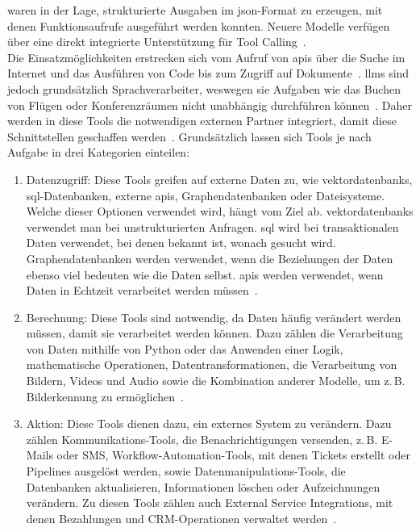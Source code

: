 waren in der Lage, strukturierte Ausgaben im \ac{json}-Format zu erzeugen, mit denen Funktionsaufrufe ausgeführt werden konnten. Neuere Modelle verfügen über eine direkt 
integrierte Unterstützung für Tool Calling~\cite[2]{tc14}. \\
Die Einsatzmöglichkeiten erstrecken sich vom Aufruf von \acp{api} über die Suche im Internet und das Ausführen von Code bis zum Zugriff auf Dokumente~\cite{tc03}. 
\acp{llm} sind jedoch grundsätzlich Sprachverarbeiter, weswegen sie Aufgaben wie das Buchen von Flügen oder Konferenzräumen nicht unabhängig durchführen können~\cite[6]{tc10}.
Daher werden in diese Tools die notwendigen externen Partner integriert, damit diese Schnittstellen geschaffen werden~\cite[6]{tc10}. Grundsätzlich lassen sich 
Tools je nach Aufgabe in drei Kategorien einteilen: 

\begin{enumerate}
    \item Datenzugriff: Diese Tools greifen auf externe Daten zu, wie \glspl{vektordatenbank}, \ac{sql}-Datenbanken, externe \acp{api}, Graphendatenbanken oder Dateisysteme. 
    Welche dieser Optionen verwendet wird, hängt vom Ziel ab. \glspl{vektordatenbank} verwendet man bei unstrukturierten Anfragen. \ac{sql} wird bei transaktionalen Daten 
    verwendet, bei denen bekannt ist, wonach gesucht wird. Graphendatenbanken werden verwendet, wenn die Beziehungen der Daten ebenso viel bedeuten wie die Daten 
    selbst. \acp{api} werden verwendet, wenn Daten in Echtzeit verarbeitet werden müssen~\cite{tc05}.
    \item Berechnung: Diese Tools sind notwendig, da Daten häufig verändert werden müssen, damit sie verarbeitet werden können. Dazu zählen die Verarbeitung
    von Daten mithilfe von Python oder das Anwenden einer Logik, mathematische Operationen, Datentransformationen, die Verarbeitung von Bildern, Videos und Audio sowie
    die Kombination anderer Modelle, um z.\,B. Bilderkennung zu ermöglichen~\cite{tc05}.
    \item Aktion: Diese Tools dienen dazu, ein externes System zu verändern. Dazu zählen Kommunikations-Tools, die Benachrichtigungen versenden, z.\,B. E-Mails oder
    SMS, Workflow-Automation-Tools, mit denen Tickets erstellt oder Pipelines ausgelöst werden, sowie Datenmanipulations-Tools, die Datenbanken aktualisieren,
    Informationen löschen oder Aufzeichnungen verändern. Zu diesen Tools zählen auch External Service Integrations, mit denen Bezahlungen und CRM-Operationen
    verwaltet werden~\cite{tc05}.
\end{enumerate}

